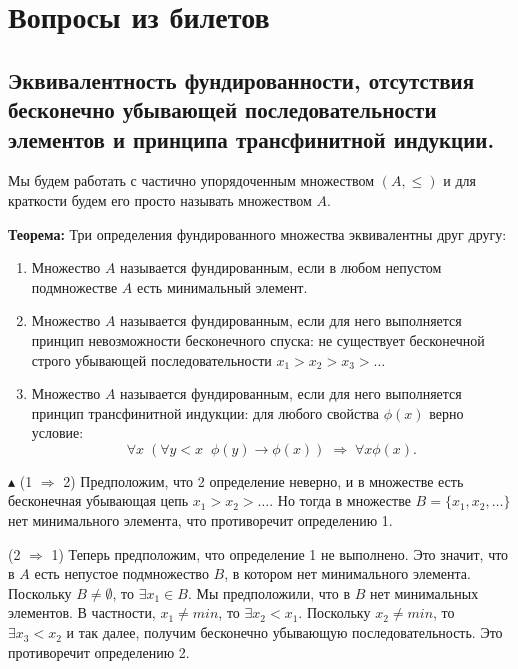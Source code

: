 \section{Вопросы из билетов}

\subsection{Эквивалентность фундированности, отсутствия бесконечно убывающей последовательности элементов и принципа трансфинитной индукции.}
\noindent Мы будем работать с частично упорядоченным множеством $(A, \leqslant)$ и для краткости будем его просто называть множеством $A$.
\newline \par \textbf{Теорема:} Три определения фундированного множества эквивалентны друг другу:
\begin{enumerate}
    \item Множество $A$ называется фундированным, если в любом непустом подмножестве $A$ есть минимальный элемент.

    \item Множество $A$ называется фундированным, если для него выполняется принцип невозможности бесконечного спуска: не существует бесконечной строго убывающей последовательности $x_1>x_2>x_3>\ldots$
    
    \item Множество $A$ называется фундированным, если для него выполняется принцип трансфинитной индукции: для любого свойства $\phi(x)$ верно условие:
    $$\forall x \; (\forall y<x \;\; \phi(y)\to \phi(x) ) \;\Rightarrow\; \forall x \phi(x).$$
\end{enumerate}

$\blacktriangle$ (1 $\Rightarrow$ 2) Предположим, что 2 определение неверно, и в множестве есть бесконечная убывающая цепь $x_1 > x_2>\ldots$. Но тогда в множестве $B = \{x_1, x_2, \ldots\}$ нет минимального элемента, что противоречит определению 1.

\par 
(2 $\Rightarrow$ 1) Теперь предположим, что определение 1 не выполнено. Это значит, что в $A$ есть непустое подмножество $B$, в котором нет минимального элемента. Поскольку $B\neq \emptyset$, то $\exists x_1\in B$. Мы предположили, что в $B$ нет минимальных элементов. В частности, $x_1\neq min$, то $\exists x_2 < x_1$. Поскольку $x_2\neq min$, то $\exists x_3 < x_2$ и так далее, получим бесконечно убывающую последовательность. Это противоречит определению 2.

